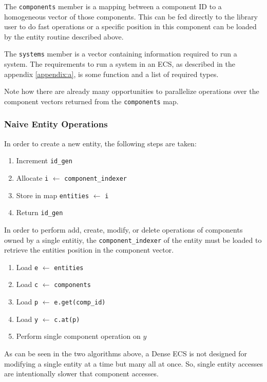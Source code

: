 The \texttt{components} member is a mapping between a component ID to a homogeneous vector of those components. This can be fed directly to the library user to do fast operations or a specific position in this component can be loaded by the entity routine described above.

The \texttt{systems} member is a vector containing information required to run a system. The requirements to run a system in an ECS, as described in the appendix \ref{appendix:a}, is some function and a list of required types. 

Note how there are already many opportunities to parallelize operations over the component vectors returned from the \texttt{components} map.

\subsubsection{Naive Entity Operations}
In order to create a new entity, the following steps are taken:
\begin{enumerate}
    \item Increment \texttt{id\_gen}
    \item Allocate \texttt{i} $\leftarrow$ \texttt{component\_indexer} 
    \item Store in map \texttt{entities} $\leftarrow$ \texttt{i}
    \item Return \texttt{id\_gen}
\end{enumerate}

In order to perform add, create, modify, or delete operations of components owned by a single entitiy, the \texttt{component\_indexer} of the entity must be loaded to retrieve the entities position in the component vector.

\begin{enumerate}
    \item Load \texttt{e} $\leftarrow$ \texttt{entities}
    \item Load \texttt{c} $\leftarrow$ \texttt{components}
    \item Load \texttt{p} $\leftarrow$ \texttt{e.get(comp\_id)}
    \item Load \texttt{y} $\leftarrow$ \texttt{c.at(p)}
    \item Perform single component operation on $y$
\end{enumerate}

As can be seen in the two algorithms above, a Dense ECS is not designed for modifying a single entity at a time but many all at once. So, single entity accesses are intentionally slower that component accesses. \cite{EnTT_SparseSets}

